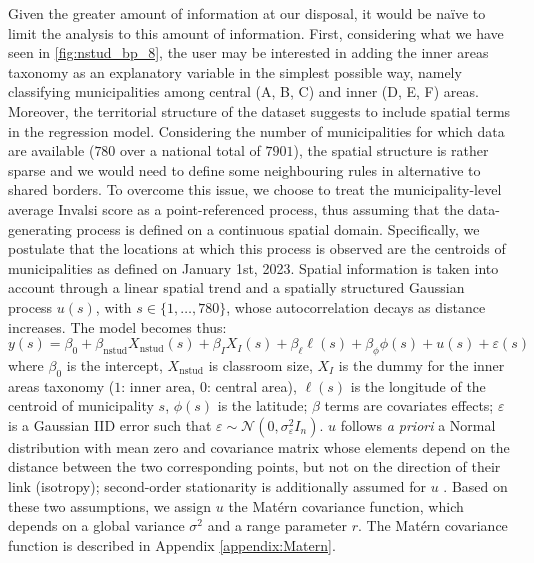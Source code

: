 \documentclass[openany, 11pt, oneside]{book}
\begin{document}
Given the greater amount of information at our disposal, it would be na{\"i}ve to limit the analysis to this amount of information. First, considering what we have seen in \ref{fig:nstud_bp_8}, the user may be interested in adding the inner areas taxonomy as an explanatory variable in the simplest possible way, namely classifying municipalities among central (A, B, C) and inner (D, E, F) areas. Moreover, the territorial structure of the dataset suggests to include spatial terms in the regression model. Considering the number of municipalities for which data are available ($780$ over a national total of $7901$), the spatial structure is rather sparse and we would need to define some neighbouring rules in alternative to shared borders. To overcome this issue, we choose to treat the municipality-level average Invalsi score as a point-referenced process, thus assuming that the data-generating process is defined on a continuous spatial domain. Specifically, we postulate that the locations at which this process is observed are the centroids of municipalities as defined on January 1st, 2023.
Spatial information is taken into account through a linear spatial trend and a spatially structured Gaussian process $u(s)$, with $s \in \lbrace 1, \dots, 780\rbrace$, whose autocorrelation decays as distance increases. The model becomes thus:
%
\begin{equation}
y(s) = \beta_0 + \beta_\mathrm{nstud} X_\mathrm{nstud}(s) + \beta_{I} X_{I}(s) + \beta_{\ell} \ell(s) +\beta_{\phi} \phi(s) + u(s) + \varepsilon(s)
\label{eq:spde}
\end{equation}
%
where $\beta_0$ is the intercept, $X_\mathrm{nstud}$ is classroom size, $X_I$ is the dummy for the inner areas taxonomy ($1$: inner area, $0$: central area), $\ell(s)$ is the longitude of the centroid of municipality $s$, $\phi(s)$ is the latitude; $\beta$ terms are covariates effects; $\varepsilon$ is a Gaussian IID error such that $\varepsilon \sim \mathcal{N}  (0, \sigma_{\varepsilon}^2 I_n)$. $u$ follows \textit{a priori} a Normal distribution with mean zero and covariance matrix whose elements depend on the distance between the two corresponding points, but not on the direction of their link (isotropy); second-order stationarity is additionally assumed for $u$ \parencite[][ Section 2.1]{Banerjee}. Based on these two assumptions, we assign $u$ the Matérn covariance function, which depends on a global variance $\sigma^2$ and a range parameter $r$. The Matérn covariance function is described in Appendix \ref{appendix:Matern}.
\end{document}
